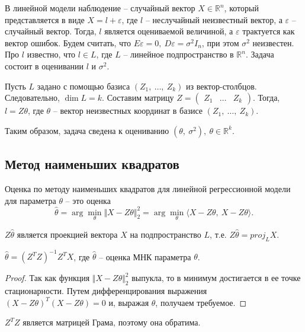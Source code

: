 В линейной модели наблюдение -- случайный вектор $\displaystyle X\in \mathbb{R}^{n}$, который представляется в виде $\displaystyle X=l+\varepsilon $, где $\displaystyle l$ -- неслучайный неизвестный вектор, а $\displaystyle \varepsilon $ -- случайный вектор. Тогда, $\displaystyle l$ является оцениваемой величиной, а $\displaystyle \varepsilon $ трактуется как вектор ошибок. Будем считать, что $\displaystyle E\varepsilon =0,\ D\varepsilon =\sigma ^{2} I_{n}$, при этом $\displaystyle \sigma ^{2}$ неизвестен. Про $\displaystyle l$ известно, что $\displaystyle l\in L$, где $\displaystyle L$ -- линейное подпространство в $\displaystyle \mathbb{R}^{n}$. Задача состоит в оценивании $\displaystyle l$ и $\displaystyle \sigma ^{2}$.

Пусть $\displaystyle L$ задано с помощью базиса $\displaystyle ( Z_{1} ,\ \dotsc ,\ Z_{k})$ из вектор-столбцов. Следовательно, $\displaystyle \dim L=k$. Составим матрицу $\displaystyle Z=\begin{pmatrix}
Z_{1} & \dotsc  & Z_{k}
\end{pmatrix}$. Тогда, $\displaystyle l=Z\theta $, где $\displaystyle \theta $ -- вектор неизвестных координат в базисе $\displaystyle ( Z_{1} ,\ \dotsc ,\ Z_{k})$.

Таким образом, задача сведена к оцениванию $\displaystyle \left( \theta ,\ \sigma ^{2}\right) ,\ \theta \in \mathbb{R}^{k}$.
\subsection{Метод наименьших квадратов}
\begin{definition}
    Оценка по методу наименьших квадратов для линейной регрессионной модели для параметра $\displaystyle \theta $ -- это оценка
    \begin{equation*}
        \hat{\theta } =\arg\min_{\theta }\Vert X-Z\theta \Vert _{2}^{2} =\arg\min_{\theta }\langle X-Z\theta ,\ X-Z\theta \rangle .
    \end{equation*}
\end{definition}
\begin{note}
    $\displaystyle Z\hat{\theta }$ является проекцией вектора $\displaystyle X$ на подпространство $\displaystyle L$, т.е. $\displaystyle Z\hat{\theta } =proj_{L} X$.
\end{note}
\begin{lemma}
    $\displaystyle \hat{\theta } =\left( Z^{T} Z\right)^{-1} Z^{T} X$, где $\displaystyle \hat{\theta }$ -- оценка МНК параметра $\displaystyle \theta $.
\end{lemma}
\begin{proof}
    Так как функция $\displaystyle \Vert X-Z\theta \Vert _{2}^{2}$ выпукла, то в минимум достигается в ее точке стационарности. Путем дифференцирования выражения $\displaystyle ( X-Z\theta )^{T}( X-Z\theta ) =0$ и, выражая $\displaystyle \theta $, получаем требуемое.
\end{proof}
\begin{note}
    $\displaystyle Z^{T} Z$ является матрицей Грама, поэтому она обратима.
\end{note}